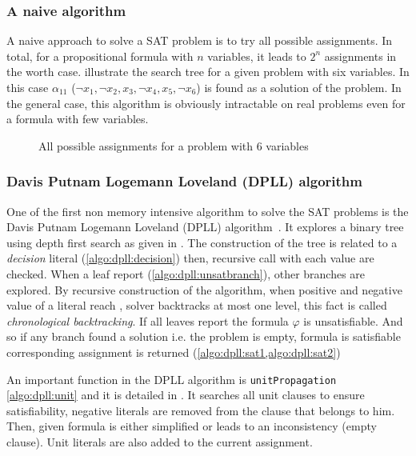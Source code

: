 \subsubsection{A naive algorithm}
A naive approach to solve a SAT problem is to try all possible assignments. In total,
for a propositional formula with $n$ variables, it leads to $2^n$ assignments in the worth case.  
 illustrate the search tree for a given problem with six variables.
In this case $\alpha_{11}$ ($\neg x_1, \neg x_2, x_3, \neg x_4, x_5, \neg x_6 $) is found as a solution of the problem. In the general case,
this algorithm is obviously intractable on real problems even for a formula with few variables.


\begin{figure}[!htbp]
	\centering
	
	\caption{All possible assignments for a problem with 6 variables}
	\label{fig:naive_algo}
\end{figure}


\subsubsection{Davis Putnam Logemann Loveland (DPLL) algorithm}\label{sec:dpll}

One of the first non memory intensive algorithm to solve the SAT problems is 
the Davis Putnam Logemann Loveland (DPLL) algorithm~\cite{dpll_62}. 
It explores a binary tree using depth first search as given in .
The construction of the tree is related to a \emph{decision} literal (\cref{algo:dpll:decision}) then,
recursive call with each value are checked.
When a leaf report \unsat (\cref{algo:dpll:unsatbranch}), other branches are explored.
By recursive construction of the algorithm, when positive and negative value of a literal reach \unsat,
solver backtracks at most one level, this fact is called \emph{chronological backtracking}.
If all leaves report \unsat the formula $\varphi$ is unsatisfiable.
And so  if any branch found a solution  i.e. the problem is empty,
formula is satisfiable corresponding assignment is returned (\cref{algo:dpll:sat1,algo:dpll:sat2})



An important function in the DPLL algorithm is \texttt{unitPropagation} \cref{algo:dpll:unit} and
it is detailed in . It searches all unit clauses to ensure satisfiability,
negative literals are removed from the clause that belongs to him. Then, given formula is either simplified
or leads to an inconsistency (empty clause). Unit literals are also added to the current assignment.

